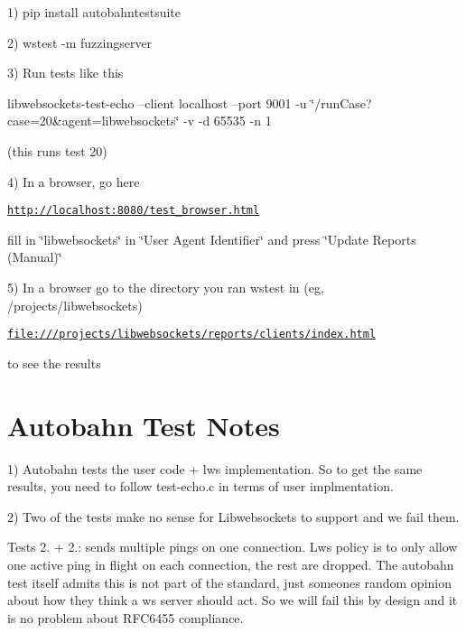 1) pip install autobahntestsuite

2) wstest -\/m fuzzingserver

3) Run tests like this

libwebsockets-\/test-\/echo --client localhost --port 9001 -\/u \char`\"{}/run\+Case?case=20\&agent=libwebsockets\char`\"{} -\/v -\/d 65535 -\/n 1

(this runs test 20)

4) In a browser, go here

\href{http://localhost:8080/test_browser.html}{\tt http\+://localhost\+:8080/test\+\_\+browser.\+html}

fill in \char`\"{}libwebsockets\char`\"{} in \char`\"{}\+User Agent Identifier\char`\"{} and press \char`\"{}\+Update Reports (\+Manual)\char`\"{}

5) In a browser go to the directory you ran wstest in (eg, /projects/libwebsockets)

\href{file:///projects/libwebsockets/reports/clients/index.html}{\tt file\+:///projects/libwebsockets/reports/clients/index.\+html}

to see the results\hypertarget{md_README.test-apps_autobahnnotes}{}\section{Autobahn Test Notes}\label{md_README.test-apps_autobahnnotes}
1) Autobahn tests the user code + lws implementation. So to get the same results, you need to follow test-\/echo.\+c in terms of user implmentation.

2) Two of the tests make no sense for Libwebsockets to support and we fail them.


\begin{DoxyItemize}
\item Tests 2. + 2.\+: sends multiple pings on one connection. Lws policy is to only allow one active ping in flight on each connection, the rest are dropped. The autobahn test itself admits this is not part of the standard, just someone\textquotesingle{}s random opinion about how they think a ws server should act. So we will fail this by design and it is no problem about R\+F\+C6455 compliance. 
\end{DoxyItemize}